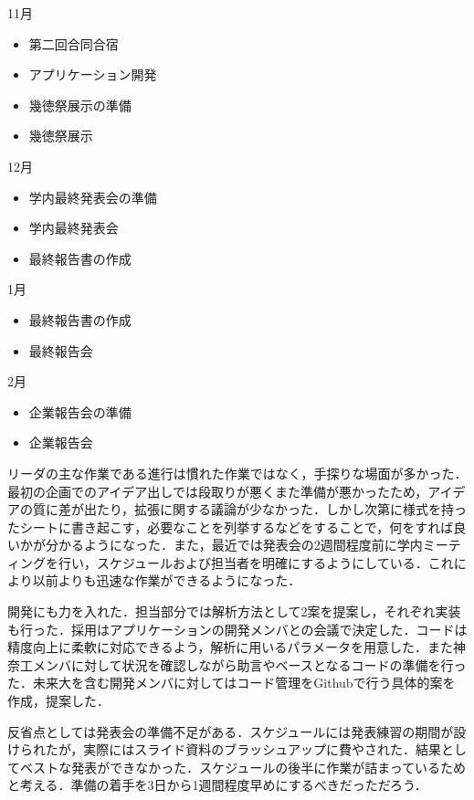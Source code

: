 11月
\begin{itemize}
\item 第二回合同合宿
\item アプリケーション開発
\item 幾徳祭展示の準備
\item 幾徳祭展示
\end{itemize}
12月
\begin{itemize}
\item 学内最終発表会の準備
\item 学内最終発表会
\item 最終報告書の作成
\end{itemize}
1月
\begin{itemize}
\item 最終報告書の作成
\item 最終報告会
\end{itemize}
2月
\begin{itemize}
\item 企業報告会の準備
\item 企業報告会
\end{itemize}

\par リーダの主な作業である進行は慣れた作業ではなく，手探りな場面が多かった．最初の企画でのアイデア出しでは段取りが悪くまた準備が悪かったため，アイデアの質に差が出たり，拡張に関する議論が少なかった．しかし次第に様式を持ったシートに書き起こす，必要なことを列挙するなどをすることで，何をすれば良いかが分かるようになった．また，最近では発表会の2週間程度前に学内ミーティングを行い，スケジュールおよび担当者を明確にするようにしている．これにより以前よりも迅速な作業ができるようになった．
\par 開発にも力を入れた．担当部分では解析方法として2案を提案し，それぞれ実装も行った．採用はアプリケーションの開発メンバとの会議で決定した．コードは精度向上に柔軟に対応できるよう，解析に用いるパラメータを用意した．また神奈工メンバに対して状況を確認しながら助言やベースとなるコードの準備を行った．未来大を含む開発メンバに対してはコード管理をGithubで行う具体的案を作成，提案した．
\par 反省点としては発表会の準備不足がある．スケジュールには発表練習の期間が設けられたが，実際にはスライド資料のブラッシュアップに費やされた．結果としてベストな発表ができなかった．スケジュールの後半に作業が詰まっているためと考える．準備の着手を3日から1週間程度早めにするべきだっただろう．

